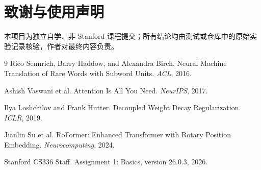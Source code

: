 \documentclass[UTF8,a4paper,11pt]{ctexart}
\begin{document}
\section{致谢与使用声明}
本项目为独立自学、非 Stanford 课程提交；所有结论均由测试或仓库中的原始实验记录核验，作者对最终内容负责。

\begin{thebibliography}{9}
Rico Sennrich, Barry Haddow, and Alexandra Birch.
\newblock Neural Machine Translation of Rare Words with Subword Units.
\newblock \emph{ACL}, 2016.

Ashish Vaswani et al.
\newblock Attention Is All You Need.
\newblock \emph{NeurIPS}, 2017.

Ilya Loshchilov and Frank Hutter.
\newblock Decoupled Weight Decay Regularization.
\newblock \emph{ICLR}, 2019.

Jianlin Su et al.
\newblock RoFormer: Enhanced Transformer with Rotary Position Embedding.
\newblock \emph{Neurocomputing}, 2024.

Stanford CS336 Staff.
\newblock Assignment 1: Basics, version 26.0.3, 2026.
\end{thebibliography}
\end{document}
